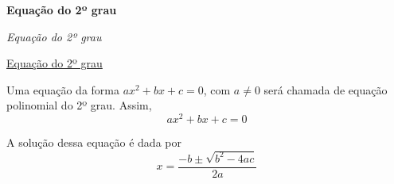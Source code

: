 \documentclass[12pt,a4paper]{article}
\begin{document}
    \begin{center}
        \textbf{Equação do 2º grau}
    \end{center}
    
    \begin{flushright}
        \textit{Equação do 2º grau}
    \end{flushright}
    
    \begin{flushleft}
        \underline{Equação do 2º grau}
    \end{flushleft}
     
     
     Uma equação da forma $ax^2 + bx + c = 0$, com $a \neq 0$ será chamada de equação polinomial do 2º grau. Assim, $$ax^2 + bx + c = 0$$
     
     A solução dessa equação é dada por $$x=\dfrac{-b \pm \sqrt{b^2 -4ac}}{2a} $$
\end{document}
